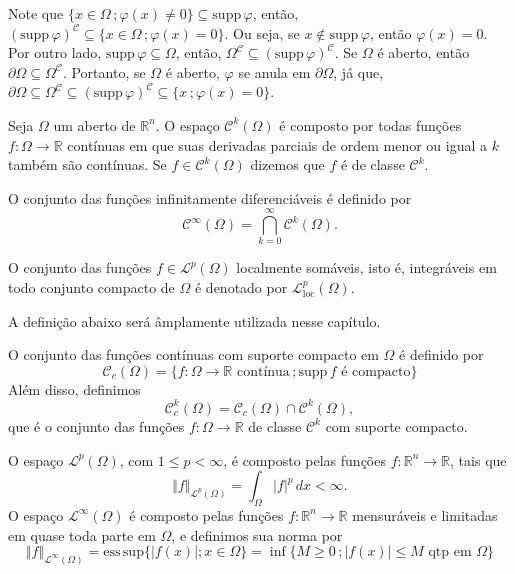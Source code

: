 \documentclass[a4paper, 11pt]{book}
\theoremstyle{definition}
\newcommand{\bR}{\mathbb{R}}
\newcommand{\cC}{\mathcal{C}}
\newcommand{\cL}{\mathcal{L}}
\newcommand{\supp}{\mathrm{supp}\,}
\begin{document}
Note que $\{x \in \Omega \,; \varphi(x) \neq 0\} \subseteq \supp \varphi$, então, $(\supp \varphi)^\cC \subseteq \{x \in \Omega \,; \varphi(x) = 0\}$. Ou seja, se $x \not\in \supp \varphi$, então $\varphi(x) = 0$.
Por outro lado, $\supp \varphi \subseteq \Omega$, então, $\Omega^\cC \subseteq (\supp \varphi)^\cC$.
Se $\Omega$ é aberto, então $\partial \Omega \subseteq \Omega^\cC$.
Portanto, se $\Omega$ é aberto, $\varphi$ se anula em $\partial\Omega$, já que, $\partial \Omega \subseteq \Omega^\cC \subseteq (\supp \varphi)^\cC \subseteq \{x \,; \varphi(x) = 0\}$.

\begin{dbox}
    Seja $\Omega$ um aberto de $\bR^n$. O espaço $\cC^k(\Omega)$ é composto por todas funções $f : \Omega \to \bR$ contínuas em que suas derivadas parciais de ordem menor ou igual a $k$ também são contínuas.
    Se $f \in \cC^k(\Omega)$ dizemos que $f$ é de classe $\cC^k$.

    O conjunto das funções infinitamente diferenciáveis é definido por
    \[
        \cC^\infty(\Omega) = \bigcap_{k=0}^\infty \cC^k(\Omega).
    \]
\end{dbox}

\begin{dbox}
    O conjunto das funções $f \in \cL^p(\Omega)$ localmente somáveis, isto é, integráveis em todo conjunto compacto de $\Omega$ é denotado por $\cL^p_{\mathrm{loc}}(\Omega)$.
\end{dbox}

A definição abaixo será âmplamente utilizada nesse capítulo.

\begin{dbox}
    O conjunto das funções contínuas com suporte compacto em $\Omega$ é definido por
    \[
        \cC_c(\Omega) = \{f : \Omega \to \bR \text{ contínua} \,; \supp f \text{ é compacto}\}
    \]
    Além disso, definimos
    \[
        \cC^k_c(\Omega) = \cC_c(\Omega) \cap \cC^k(\Omega),
    \]
    que é o conjunto das funções $f : \Omega \to \bR$ de classe $\cC^k$ com suporte compacto.
\end{dbox}

\begin{dbox}[Espaços $\cL^p$ e $\cL^\infty$]
    O espaço $\cL^p(\Omega)$, com $1 \leqslant p < \infty$, é composto pelas funções $f : \bR^n \to \bR$, tais que
    \[
        \Vert f \Vert_{\cL^p(\Omega)} = \int_\Omega |f|^p \, dx < \infty.
    \]
    O espaço $\cL^\infty(\Omega)$ é composto pelas funções $f : \bR^n \to \bR$ mensuráveis e limitadas em quase toda parte em $\Omega$, e definimos sua norma por
    \[
        \Vert f \Vert_{\cL^\infty(\Omega)} = \mathrm{ess\,sup} \{|f(x)|; x \in \Omega\} =\inf \{M \geqslant 0 \,; |f(x)| \leqslant M \text{ qtp em } \Omega\}
    \]
\end{dbox}
\end{document}
